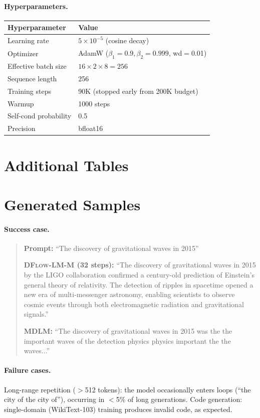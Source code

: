 \documentclass{article}
\newcommand{\ours}{\textsc{DFlow-LM}}
\begin{document}
\paragraph{Hyperparameters.}
\begin{center}
\begin{tabular}{ll}
\toprule
Hyperparameter & Value \\
\midrule
Learning rate & $5 \times 10^{-5}$ (cosine decay) \\
Optimizer & AdamW ($\beta_1{=}0.9, \beta_2{=}0.999$, wd$=$0.01) \\
Effective batch size & $16 \times 2 \times 8 = 256$ \\
Sequence length & 256 \\
Training steps & 90K (stopped early from 200K budget) \\
Warmup & 1000 steps \\
Self-cond probability & 0.5 \\
Precision & bfloat16 \\
\bottomrule
\end{tabular}
\end{center}

\section{Additional Tables}
\label{app:tables}



\section{Generated Samples}
\label{app:samples}

\paragraph{Success case.}
\begin{quote}
\textbf{Prompt:} ``The discovery of gravitational waves in 2015''

\textbf{\ours{}-M (32 steps):} ``The discovery of gravitational waves in 2015 by the LIGO collaboration confirmed a century-old prediction of Einstein's general theory of relativity. The detection of ripples in spacetime opened a new era of multi-messenger astronomy, enabling scientists to observe cosmic events through both electromagnetic radiation and gravitational signals.''

\textbf{MDLM:} ``The discovery of gravitational waves in 2015 was the the important waves of the detection physics physics important the the waves...''
\end{quote}

\paragraph{Failure cases.}
Long-range repetition ($>$512 tokens): the model occasionally enters loops (``the city of the city of''), occurring in ${<}$5\% of long generations.
Code generation: single-domain (WikiText-103) training produces invalid code, as expected.
\end{document}
